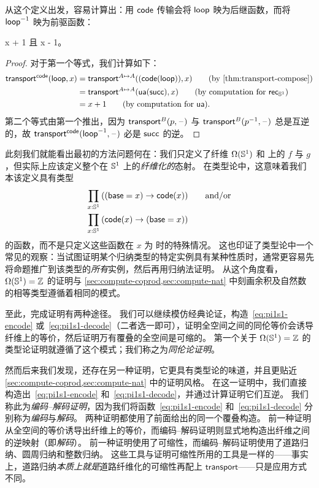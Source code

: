 从这个定义出发，容易计算出：用 $\mathsf{code}$ 传输会将 $\mathsf{loop}$ 映为后继函数，而将 $\mathord{{\mathsf{loop}}^{-1}}$ 映为前驱函数：


\begin{lem} \label{lem:transport-s1-code}
 {x + 1} 且
 {x - 1}。
\end{lem}

\begin{proof}
对于第一个等式，我们计算如下：
\begin{align}
{\transfib \code \lloop x}
&= \transfib {A \mapsto A} {(\ap{\code}{\lloop})} x \tag{by \cref{thm:transport-compose}}\\
&= \transfib {A \mapsto A} {\ua (\Zsuc)} x \tag{by computation for $\rec{\Sn^1}$}\\
&= x + 1 \tag{by computation for \ua}.
\end{align}
第二个等式由第一个推出，因为 $\mathsf{transport}^{B}(p,\mathord{\hspace{1pt}\text{--}\hspace{1pt}})$ 与 $\mathsf{transport}^{B}(\mathord{{p}^{-1}},\mathord{\hspace{1pt}\text{--}\hspace{1pt}})$ 总是互逆的，故 $\mathsf{transport}^{\mathsf{code}}(\mathord{{\mathsf{loop}}^{-1}},\mathord{\hspace{1pt}\text{--}\hspace{1pt}})$ 必是 $\mathsf{succ}$ 的逆。
\end{proof}

此刻我们就能看出最初的方法问题何在：我们只定义了纤维 $\Omega(\mathbb{S}^1)$ 和 \Z 上的 $f$ 与 $g$，但实际上应该定义整个在 $\mathbb{S}^1$ 上的\emph{纤维化的}态射。
在类型论中，这意味着我们本该定义具有类型
\begin{align}
  \prd{x:\Sn^1} &((\base=x) \to \code(x)) \qquad\text{and/or} \label{eq:pi1s1-encode}\\
  \prd{x:\Sn^1} &(\code(x) \to (\base=x))\label{eq:pi1s1-decode}
\end{align}
的函数，而不是只定义这些函数在 $x$ 为 \base 时的特殊情况。
这也印证了类型论中一个常见的观察：当试图证明某个归纳类型的特定实例具有某种性质时，通常更容易先将命题推广到该类型的\emph{所有}实例，然后再用归纳法证明。
从这个角度看，$\Omega(\mathbb{S}^1)=\mathbb{Z}$ 的证明与 \cref{sec:compute-coprod,sec:compute-nat} 中刻画余积及自然数的相等类型遵循着相同的模式。

至此，完成证明有两种途径。
我们可以继续模仿经典论证，构造~\eqref{eq:pi1s1-encode} 或~\eqref{eq:pi1s1-decode}（二者选一即可），证明全空间之间的同伦等价会诱导纤维上的等价，然后证明万有覆叠的全空间是可缩的。
第一个关于 $\Omega(\mathbb{S}^1)=\mathbb{Z}$ 的类型论证明就遵循了这个模式；我们称之为\emph{同伦论证明}。

然而后来我们发现，还存在另一种证明，它更具有类型论的味道，并且更贴近 \cref{sec:compute-coprod,sec:compute-nat} 中的证明风格。
在这一证明中，我们直接构造出~\eqref{eq:pi1s1-encode} 和~\eqref{eq:pi1s1-decode}，并通过计算证明它们互逆。
我们称此为\emph{编码--解码证明}，因为我们将函数~\eqref{eq:pi1s1-encode} 和~\eqref{eq:pi1s1-decode} 分别称为\emph{编码}与\emph{解码}。
两种证明都使用了前面给出的同一个覆叠构造。
前一种证明从全空间的等价诱导出纤维上的等价，而编码--解码证明则显式地构造出纤维之间的逆映射（即\emph{解码}）。
前一种证明使用了可缩性，而编码--解码证明使用了道路归纳、圆周归纳和整数归纳。
这些工具与证明可缩性所用的工具是一样的——事实上，道路归纳\emph{本质上就是}道路纤维化的可缩性再配上 $\mathsf{transport}$——只是应用方式不同。

